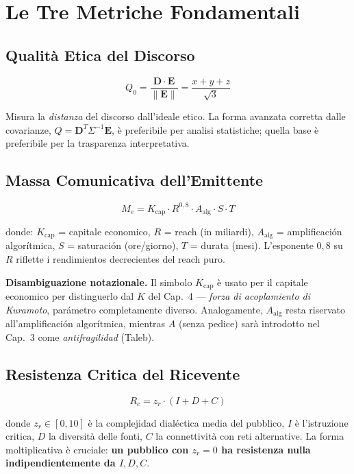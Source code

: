 \section{Le Tre Metriche
Fondamentali}\label{le-tre-metriche-fondamentali}

\subsection{Qualità Etica del
Discorso}\label{qualituxe0-etica-del-discorso}

\[
Q_0 = \frac{\mathbf{D} \cdot \mathbf{E}}{\|\mathbf{E}\|} = \frac{x + y + z}{\sqrt{3}}
\]

Misura la \emph{distanza} del discorso dall'ideale etico. La forma
avanzata corretta dalle covarianze,
\(Q = \mathbf{D}^T \Sigma^{-1} \mathbf{E}\), è preferibile per analisi
statistiche; quella base è preferibile per la trasparenza
interpretativa.

\subsection{Massa Comunicativa
dell'Emittente}\label{massa-comunicativa-dellemittente}

\[
M_e = K_{\text{cap}} \cdot R^{0{,}8} \cdot A_{\text{alg}} \cdot S \cdot T
\]

donde: \(K_{\text{cap}}\) = capitale economico, \(R\) = reach (in
miliardi), \(A_{\text{alg}}\) = amplificación algorítmica, \(S\) =
saturación (ore/giorno), \(T\) = durata (mesi). L'esponente \(0{,}8\)
su \(R\) riflette i rendimientos decrecientes del reach puro.

\Hypoth{} \textbf{Disambiguazione notazionale.} Il simbolo
\(K_{\text{cap}}\) è usato per il capitale economico per distinguerlo
dal \(K\) del Cap.~4 --- \emph{forza di acoplamiento di Kuramoto},
parámetro completamente diverso. Analogamente, \(A_{\text{alg}}\) resta
riservato all'amplificación algorítmica, mientras \(A\) (senza pedice)
sarà introdotto nel Cap.~3 come \emph{antifragilidad} (Taleb).

\subsection{Resistenza Critica del
Ricevente}\label{resistenza-critica-del-ricevente}

\[
R_c = z_r \cdot (I + D + C)
\]

donde \(z_r \in [0, 10]\) è la complejidad dialéctica media del pubblico,
\(I\) è l'istruzione critica, \(D\) la diversità delle fonti, \(C\) la
connettività con reti alternative. La forma moltiplicativa è cruciale:
\textbf{un pubblico con \(z_r = 0\) ha resistenza nulla
indipendientemente da \(I, D, C\)}.



